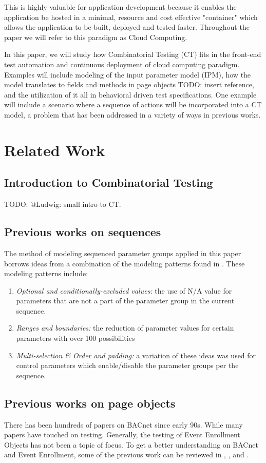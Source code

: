 \documentclass[conference]{IEEEtran}
\newcommand{\todo}[1]{}
\renewcommand{\todo}[1]{{\color{red} TODO: {#1}}}
\begin{document}
This is highly valuable for application development because it enables the application be hosted in a minimal, resource and cost effective "container" which 
allows the application to be built, deployed and tested faster. Throughout the paper we will refer to this paradigm as Cloud Computing.

In this paper, we will study how Combinatorial Testing (CT) fits in the front-end test automation and continuous deployment of cloud computing paradigm.
Examples will include modeling of the input parameter model (IPM), how the model translates to fields and methods in page objects \todo{insert reference}, 
and the utilization of it all in behavioral driven test specifications.
One example will include a scenario where a sequence of actions will be incorporated into a CT model, a problem that has been addressed in a variety of ways in previous works.

\section{Related Work}

	\subsection{Introduction to Combinatorial Testing}
	\todo{@Ludwig: small intro to CT}.

	\subsection{Previous works on sequences}
	The method of modeling sequenced parameter groups applied in this paper borrows ideas from a combination of the modeling patterns found in \cite{segall2012common}.
	These modeling patterns include: 
	\begin{enumerate}
		\item \textit{Optional and conditionally-excluded values:} the use of N/A value for parameters that are not a part of the parameter group in the current sequence.
		\item \textit{Ranges and boundaries:} the reduction of parameter values for certain parameters with over 100 possibilities
		\item	\textit{Multi-selection \& Order and padding:} a variation of these ideas was used for control parameters which enable/disable the parameter groups per the sequence.
	\end{enumerate}

	\subsection{Previous works on page objects}
	There has been hundreds of papers on BACnet since early 90s. 
	While many papers have touched on testing. Generally, the testing of Event Enrollment Objects has not been a topic of focus.
	To get a better understanding on BACnet and Event Enrollment, some of the previous work can be reviewed in \cite{bushby1997bacnettm}, \cite{bushby2002bacnet}, \cite{nussbaumerbacnet} and \cite{newman2015bacnet}. 
	
\end{document}
